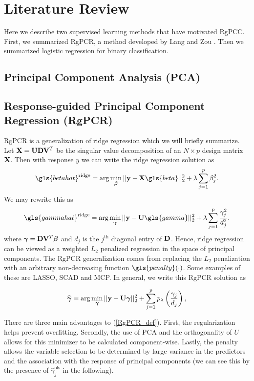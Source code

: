 \documentclass[main.tex]{subfiles}
\begin{document}
\section{Literature Review}
Here we describe two supervised learning methods that have motivated RgPCC. First, we summarized RgPCR, a method developed by Lang and Zou \cite{langzou}.  Then we summarized logistic regression for binary classification.

\subsection{Principal Component Analysis (PCA)}


\subsection{Response-guided Principal Component Regression (RgPCR)}
RgPCR is a generalization of ridge regression which we will briefly summarize. Let $\mathbf{X} = \mathbf{U} \mathbf{D} \mathbf{V}^T$ be the singular value decomposition of an $N \times p$ design matrix $\mathbf{X}$. Then with response $y$ we can write the ridge regression solution as
\begin{align}
    \gls{betahat}^{\ridge} = \argmin_{\bbeta} ||\y - \X \gls{beta}||_2^2 + \lambda \sum_{j = 1}^p \beta_j^2.
\end{align}
We may rewrite this as
\begin{align}
    \gls{gammahat}^{\ridge} = \argmin_{\bgamma} ||\y - \U \gls{gamma}||^2_2 + \lambda \sum_{j = 1}^p \frac{\gamma_j^2}{d_j^2}. \label{RgPCR_ridge}
\end{align}
where $\boldsymbol \gamma = \mathbf{D} \mathbf{V}^T \boldsymbol \beta$ and $d_j$ is the $j^{\text{th}}$ diagonal entry of $\mathbf{D}$. Hence, ridge regression can be viewed as a weighted $L_2$ penalized regression in the space of principal components. The RgPCR generalization comes from replacing the $L_2$ penalization with an arbitrary non-decreasing function $\gls{penalty}(\cdot)$. Some examples of these are LASSO, SCAD and MCP. In general, we write this RgPCR solution as

\begin{align}
    \widehat{\boldsymbol \gamma} = \text{arg} \min_{\boldsymbol \gamma} ||\mathbf{y} - \mathbf{U} \boldsymbol \gamma||^2_2 + \sum_{j = 1}^p p_\lambda \left ( \frac{\gamma_j}{d_j} \right ), \label{RgPCR_def}
\end{align}

There are three main advantages to (\ref{RgPCR_def}). First, the regularization helps prevent overfitting. Secondly, the use of PCA and the orthogonality of $U$ allows for this minimizer to be calculated component-wise. Lastly, the penalty allows the variable selection to be determined by large variance in the predictors and the association with the response of principal components (we can see this by the presence of $\hat{\gamma}^{\text{ols}}_j$ in the following). 
\end{document}
